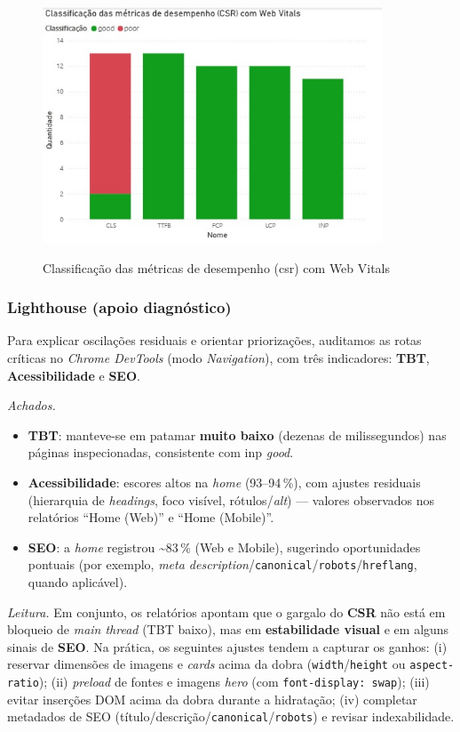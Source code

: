 \begin{figure}[H]
\centering
\caption{Classificação das métricas de desempenho (\acrshort{csr}) com Web Vitals}
\includegraphics[width=0.9\textwidth]{media/metricas_csr_web_vitals.jpeg}
\label{fig:csr-webvitals}
\end{figure}

\subsubsection*{Lighthouse (apoio diagnóstico)}
Para explicar oscilações residuais e orientar priorizações, auditamos as rotas críticas no \emph{Chrome DevTools} (modo \emph{Navigation}), com três indicadores: \textbf{TBT}, \textbf{Acessibilidade} e \textbf{SEO}.

\noindent \textit{Achados.}
\begin{itemize}
  \item \textbf{TBT}: manteve-se em patamar \textbf{muito baixo} (dezenas de milissegundos) nas páginas inspecionadas, consistente com \acrshort{inp} \textit{good}.
  \item \textbf{Acessibilidade}: escores altos na \emph{home} (93--94\,\%), com ajustes residuais (hierarquia de \emph{headings}, foco visível, rótulos/\textit{alt}) — valores observados nos relatórios “Home (Web)” e “Home (Mobile)”.
  \item \textbf{SEO}: a \emph{home} registrou \textasciitilde{}83\,\% (Web e Mobile), sugerindo oportunidades pontuais (por exemplo, \emph{meta description}/\texttt{canonical}/\texttt{robots}/\texttt{hreflang}, quando aplicável).
\end{itemize}

\noindent \textit{Leitura.} Em conjunto, os relatórios apontam que o gargalo do \textbf{CSR} não está em bloqueio de \emph{main thread} (TBT baixo), mas em \textbf{estabilidade visual} e em alguns sinais de \textbf{SEO}. Na prática, os seguintes ajustes tendem a capturar os ganhos: (i) reservar dimensões de imagens e \emph{cards} acima da dobra (\texttt{width}/\texttt{height} ou \texttt{aspect-ratio}); (ii) \emph{preload} de fontes e imagens \emph{hero} (com \texttt{font-display: swap}); (iii) evitar inserções DOM acima da dobra durante a hidratação; (iv) completar metadados de SEO (título/descrição/\texttt{canonical}/\texttt{robots}) e revisar indexabilidade.

